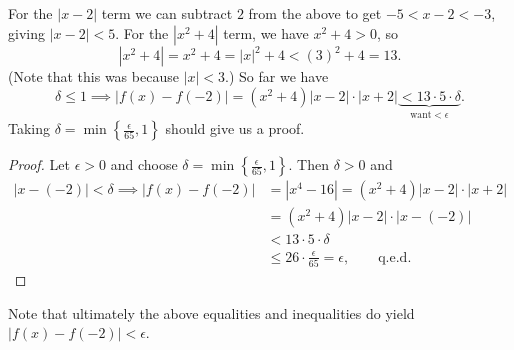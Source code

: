 For the $|x-2|$ term we can subtract $2$ from the above
to get $-5<x-2<-3$, giving $|x-2|<5$.\footnotemark%
\hphantom{. }For the $|x^2+4|$ term, we have $x^2+4>0$, so 
$$|x^2+4|=x^2+4=|x|^2+4<(3)^2+4=13.$$
(Note that this was because $|x|<3$.)
So far we have
$$\delta\le1\implies
|f(x)-f(-2)|=(x^2+4)|x-2|\cdot|x+2|
\underbrace{<13\cdot5\cdot\delta}_{\text{want} <\epsilon}.$$
Taking $\delta=\min\left\{\frac{\epsilon}{65},1\right\}$
should give us a proof.

\begin{proof}
Let $\epsilon>0$ and choose 
$\delta=\min\left\{\frac{\epsilon}{65},1\right\}$.
Then $\delta>0$ and
\begin{align*}
|x-(-2)|<\delta\implies
|f(x)-f(-2)|&=|x^4-16|=(x^2+4)|x-2|\cdot|x+2|\\
&=(x^2+4)|x-2|\cdot|x-(-2)|\\
&<13\cdot 5\cdot\delta\\
&\le26\cdot\frac{\epsilon}{65}=\epsilon,\qquad\text{q.e.d.}
\end{align*}
\end{proof}\eex
Note that ultimately the above equalities and inequalities
do yield $|f(x)-f(-2)|<\epsilon$.











